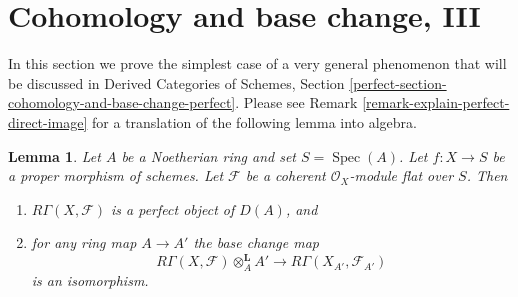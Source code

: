 \documentclass{stacks-project}
\theoremstyle{plain}
\newtheorem{lemma}[subsection]{Lemma}
\theoremstyle{definition}
\theoremstyle{remark}
\numberwithin{equation}{subsection}
\def\Spec{\mathop{\mathrm{Spec}}}
\begin{document}
\section{Cohomology and base change, III}
\label{section-cohomology-and-base-change-perfect}

\noindent
In this section we prove the simplest case of a very general phenomenon
that will be discussed in
Derived Categories of Schemes, Section
\ref{perfect-section-cohomology-and-base-change-perfect}.
Please see Remark \ref{remark-explain-perfect-direct-image} for a translation
of the following lemma into algebra.

\begin{lemma}
\label{lemma-perfect-direct-image}
Let $A$ be a Noetherian ring and set $S = \Spec(A)$. Let $f : X \to S$ be a
proper morphism of schemes. Let $\mathcal{F}$ be a coherent
$\mathcal{O}_X$-module flat over $S$. Then
\begin{enumerate}
\item $R\Gamma(X, \mathcal{F})$ is a perfect object of $D(A)$, and
\item for any ring map $A \to A'$ the base change map
$$
R\Gamma(X, \mathcal{F}) \otimes_A^{\mathbf{L}} A'
\longrightarrow
R\Gamma(X_{A'}, \mathcal{F}_{A'})
$$
is an isomorphism.
\end{enumerate}
\end{lemma}
\end{document}
